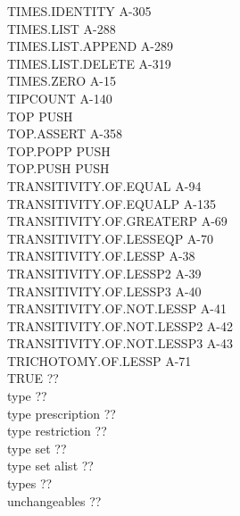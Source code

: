 \documentclass[10pt]{book}
\newenvironment{pubasis}{\begin{flushleft}}{\end{flushleft}}
\begin{document}
\begin{pubasis}
TIMES.IDENTITY                               A-305\\
TIMES.LIST                                   A-288\\
TIMES.LIST.APPEND                            A-289\\
TIMES.LIST.DELETE                            A-319\\
TIMES.ZERO                                   A-15\\
TIPCOUNT                                     A-140\\
TOP                                          PUSH\\
TOP.ASSERT                                   A-358\\
TOP.POPP                                     PUSH\\
TOP.PUSH                                     PUSH\\
TRANSITIVITY.OF.EQUAL                        A-94\\
TRANSITIVITY.OF.EQUALP                       A-135\\
TRANSITIVITY.OF.GREATERP                     A-69\\
TRANSITIVITY.OF.LESSEQP                      A-70\\
TRANSITIVITY.OF.LESSP                        A-38\\
TRANSITIVITY.OF.LESSP2                       A-39\\
TRANSITIVITY.OF.LESSP3                       A-40\\
TRANSITIVITY.OF.NOT.LESSP                    A-41\\
TRANSITIVITY.OF.NOT.LESSP2                   A-42\\
TRANSITIVITY.OF.NOT.LESSP3                   A-43\\
TRICHOTOMY.OF.LESSP                          A-71\\
TRUE                                         ??\\
type                                         ??\\
type prescription                            ??\\
type restriction                             ??\\
type set                                     ??\\
type set alist                               ??\\
types                                        ??\\
unchangeables                                ??\\

\end{pubasis}
\end{document}
